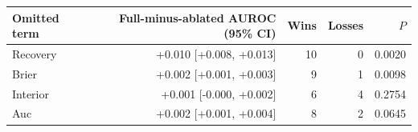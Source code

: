 \begin{tabular}{lrrrr}
\toprule
Omitted term & Full-minus-ablated AUROC (95\% CI) & Wins & Losses & $P$ \\
\midrule
Recovery & +0.010 [+0.008, +0.013] & 10 & 0 & 0.0020 \\
Brier & +0.002 [+0.001, +0.003] & 9 & 1 & 0.0098 \\
Interior & +0.001 [-0.000, +0.002] & 6 & 4 & 0.2754 \\
Auc & +0.002 [+0.001, +0.004] & 8 & 2 & 0.0645 \\
\bottomrule
\end{tabular}